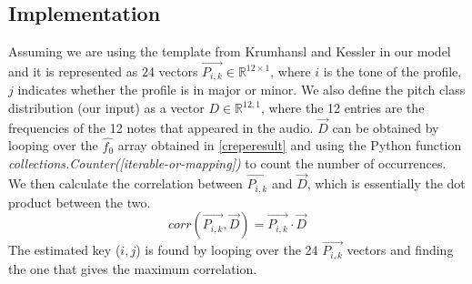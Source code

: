 \subsection{Implementation}
Assuming we are using the template from Krumhansl and Kessler in our model and it is represented as 24 vectors $\vec{P_{i,k}} \in \mathbb{R}^{12 \times 1}$, 
where $i$ is the tone of the profile, $j$ indicates whether the profile is in major or minor.
We also define the pitch class distribution (our input) as a vector $D \in \mathbb{R}^{12,1}$, where the 12 entries are the frequencies of the 12 notes that appeared in the audio.
$\vec{D}$ can be obtained by looping over the $\hat{f_0}$ array obtained in \autoref{creperesult} and using the Python function \emph{collections.Counter([iterable-or-mapping])} to count the
number of occurrences. We then calculate the correlation between $\vec{P_{i,k}}$ and $\vec{D}$, which is essentially the dot product between the two.
\[ corr(\vec{P_{i,k}},\vec{D}) = \vec{P_{i,k}} \cdot \vec{D} \]
The estimated key ($i,j$) is found by looping over the 24 $\vec{P_{i,k}}$ vectors and finding the one that gives the maximum correlation.